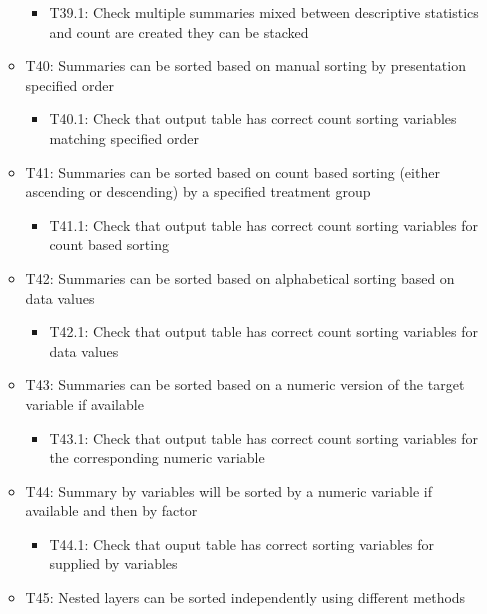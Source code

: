 \documentclass[
]{article}
\providecommand{\tightlist}{%
  \setlength{\itemsep}{0pt}\setlength{\parskip}{0pt}}
\begin{document}
\begin{itemize}
\begin{itemize}
    \begin{itemize}
    \tightlist
    \item
      T39.1: Check multiple summaries mixed between descriptive
      statistics and count are created they can be stacked
    \end{itemize}
  \item
    T40: Summaries can be sorted based on manual sorting by presentation
    specified order

    \begin{itemize}
    \tightlist
    \item
      T40.1: Check that output table has correct count sorting variables
      matching specified order
    \end{itemize}
  \item
    T41: Summaries can be sorted based on count based sorting (either
    ascending or descending) by a specified treatment group

    \begin{itemize}
    \tightlist
    \item
      T41.1: Check that output table has correct count sorting variables
      for count based sorting
    \end{itemize}
  \item
    T42: Summaries can be sorted based on alphabetical sorting based on
    data values

    \begin{itemize}
    \tightlist
    \item
      T42.1: Check that output table has correct count sorting variables
      for data values
    \end{itemize}
  \item
    T43: Summaries can be sorted based on a numeric version of the
    target variable if available

    \begin{itemize}
    \tightlist
    \item
      T43.1: Check that output table has correct count sorting variables
      for the corresponding numeric variable
    \end{itemize}
  \item
    T44: Summary by variables will be sorted by a numeric variable if
    available and then by factor

    \begin{itemize}
    \tightlist
    \item
      T44.1: Check that ouput table has correct sorting variables for
      supplied by variables
    \end{itemize}
  \item
    T45: Nested layers can be sorted independently using different
    methods


\end{itemize}
\end{itemize}
\end{document}
